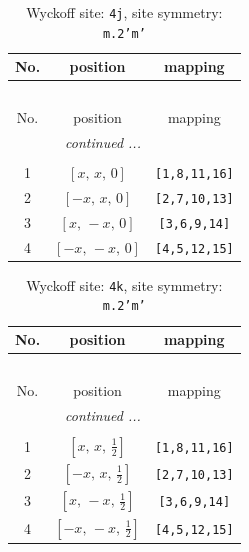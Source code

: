 \documentclass[fleqn,8pt]{jsarticle}
\begin{document}
\begin{longtable}{ccc}
\caption{Wyckoff site: {\tt 4j}, site symmetry: {\tt m.2'm'}}
 \\
 \hline \hline
No. & position & mapping \\ \hline \endfirsthead

\multicolumn{2}{l}{\tablename\ \thetable{}} \\
 \hline \hline
No. & position & mapping \\ \hline \endhead

 \hline \hline
\multicolumn{2}{r}{\footnotesize\it continued ...} \\ \endfoot

 \hline \hline
\multicolumn{2}{r}{} \\ \endlastfoot

1 & $\left[ x,\, x,\, 0 \right]$ & {\tt [1,8,11,16]} \\ \hline
2 & $\left[ - x,\, x,\, 0 \right]$ & {\tt [2,7,10,13]} \\ \hline
3 & $\left[ x,\, - x,\, 0 \right]$ & {\tt [3,6,9,14]} \\ \hline
4 & $\left[ - x,\, - x,\, 0 \right]$ & {\tt [4,5,12,15]} \\
\end{longtable}
\renewcommand{\arraystretch}{1.2}
\begin{longtable}{ccc}
\caption{Wyckoff site: {\tt 4k}, site symmetry: {\tt m.2'm'}}
 \\
 \hline \hline
No. & position & mapping \\ \hline \endfirsthead

\multicolumn{2}{l}{\tablename\ \thetable{}} \\
 \hline \hline
No. & position & mapping \\ \hline \endhead

 \hline \hline
\multicolumn{2}{r}{\footnotesize\it continued ...} \\ \endfoot

 \hline \hline
\multicolumn{2}{r}{} \\ \endlastfoot

1 & $\left[ x,\, x,\, \frac{1}{2} \right]$ & {\tt [1,8,11,16]} \\ \hline
2 & $\left[ - x,\, x,\, \frac{1}{2} \right]$ & {\tt [2,7,10,13]} \\ \hline
3 & $\left[ x,\, - x,\, \frac{1}{2} \right]$ & {\tt [3,6,9,14]} \\ \hline
4 & $\left[ - x,\, - x,\, \frac{1}{2} \right]$ & {\tt [4,5,12,15]} \\
\end{longtable}
\end{document}

